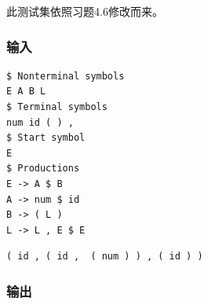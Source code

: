 \documentclass[lang=cn,11pt,a4paper,cite=authornum]{paper}
\begin{document}
此测试集依照习题4.6修改而来。

\subsubsection{输入}

\begin{code}
\begin{verbatim}
$ Nonterminal symbols
E A B L
$ Terminal symbols
num id ( ) ,
$ Start symbol
E
$ Productions
E -> A $ B
A -> num $ id
B -> ( L )
L -> L , E $ E
\end{verbatim}
\end{code}

\begin{code}
\begin{verbatim}
( id , ( id ,  ( num ) ) , ( id ) )
\end{verbatim}
\end{code}

\subsubsection{输出}
\end{document}
